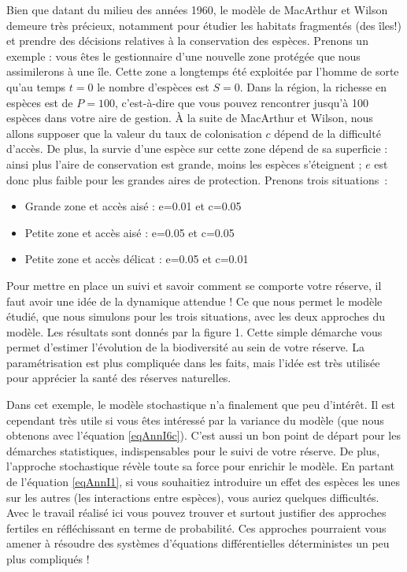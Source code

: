 Bien que datant du milieu des années 1960, le modèle de MacArthur et Wilson demeure très précieux, notamment pour étudier les habitats fragmentés (des îles!) et prendre des décisions relatives à la conservation des espèces. Prenons un exemple : vous êtes le gestionnaire d'une nouvelle zone protégée que nous assimilerons à une île. Cette zone a longtemps été exploitée par l'homme de sorte qu'au temps $t=0$ le nombre d'espèces est $S=0$. Dans la région, la richesse en espèces est de $P=100$, c'est-à-dire que vous pouvez rencontrer jusqu'à 100 espèces dans votre aire de gestion. À la suite de MacArthur et Wilson, nous allons supposer que la valeur du taux de colonisation $c$ dépend de la difficulté d'accès. De plus, la survie d'une espèce sur cette zone dépend de sa superficie : ainsi plus l'aire de conservation est grande, moins les espèces s'éteignent ; $e$ est donc plus faible pour les grandes aires de protection. Prenons trois situations~:
\begin{itemize}
\item Grande zone et accès aisé : e=0.01 et c=0.05
\item Petite zone et accès aisé : e=0.05 et c=0.05
\item Petite zone et accès délicat : e=0.05 et c=0.01
\end{itemize}
Pour mettre en place un suivi et savoir comment se comporte votre réserve, il faut avoir une idée de la dynamique attendue ! Ce que nous permet le modèle étudié, que nous simulons pour les trois situations, avec les deux approches du modèle. Les résultats sont donnés par la figure 1. Cette simple démarche vous permet d'estimer l'évolution de la biodiversité au sein de votre réserve. La paramétrisation est plus compliquée dans les faits, mais l'idée est très utilisée pour apprécier la santé des réserves naturelles.


Dans cet exemple, le modèle stochastique n'a finalement que peu d'intérêt. Il est cependant très utile si vous êtes intéressé par la variance du modèle (que nous obtenons avec l'équation \eqref{eqAnnI6c}). C'est aussi un bon point de départ pour les démarches statistiques, indispensables pour le suivi de votre réserve. De plus, l'approche stochastique révèle toute sa force pour enrichir le modèle. En partant de l'équation \eqref{eqAnnI1}, si vous souhaitiez introduire un effet des espèces les unes sur les autres (les interactions entre espèces), vous auriez quelques difficultés. Avec le travail réalisé ici vous pouvez trouver et surtout justifier des approches fertiles en réfléchissant en terme de probabilité. Ces approches pourraient vous amener à résoudre des systèmes d'équations différentielles déterministes un peu plus compliqués !


